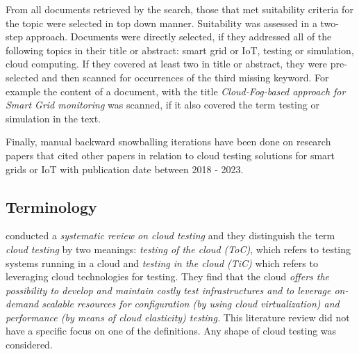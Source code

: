 From all documents retrieved by the search, those that met suitability criteria for the topic were selected in top down manner. Suitability was assessed in a two-step approach. Documents were directly selected, if they addressed all of the following topics in their title or abstract: smart grid or IoT, testing or simulation, cloud computing. If they covered at least two in title or abstract, they were pre-selected and then scanned for occurrences of the third missing keyword. For example the content of a document, with the title \textit{Cloud-Fog-based approach for Smart Grid monitoring} was scanned, if it also covered the term testing or simulation in the text. 

Finally, manual backward snowballing iterations have been done on research papers that cited other papers in relation to cloud testing solutions for smart grids or IoT  with publication date between 2018 - 2023.

\subsection{Terminology}
\citeauthor{bertolino2019systematic} conducted a \textit{systematic review on cloud testing} and they distinguish the term \textit{cloud testing} by two meanings: \textit{testing of the cloud (ToC)}, which refers to testing systems running in a cloud and \textit{testing in the cloud (TiC)} which refers to leveraging cloud technologies for testing. They find that the cloud \textit{offers the possibility to develop and maintain costly test infrastructures and to leverage on-demand scalable resources for configuration (by using cloud virtualization) and performance (by means of cloud elasticity) testing.} This literature review did not have a specific focus on one of the definitions. Any shape of cloud testing was considered.




